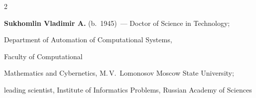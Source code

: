 \begin{multicols}{2}





































\vspace*{10pt}


\noindent


\textbf{Sukhomlin Vladimir A.} (b.\ 1945)~--- Doctor of Science in Technology; 


Department of Automation of Computational Systems,


Faculty of  Computational


Mathematics and Cybernetics, M.\,V.~Lomonosov Moscow State University;


leading scientist,  Institute of Informatics Problems,  Russian Academy of Sciences























\end{multicols}
